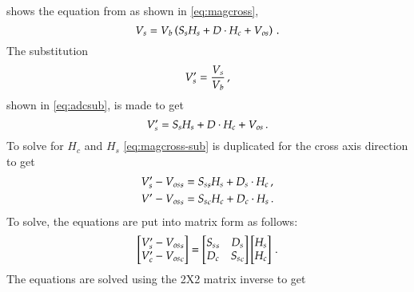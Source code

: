

\label{ch:mag-deriv}

 shows the equation from \cite{AN215} as shown in \cref{eq:magcross},
\begin{equation}
    V_s = V_b \left(S_s H_s + D \cdot H_c + V_{os} \right) \,.
    \label{eq:magcross2}
\end{equation}
The substitution
\begin{equation}
    V_s' =\frac{V_s}{V_b}\,,
\end{equation}
shown in \cref{eq:adcsub}, is made to get
\begin{equation}
    V_s' = S_s H_s + D \cdot H_c + V_{os}\,.
    \label{eq:magcross-sub}
\end{equation}
To solve for $H_c$ and $H_s$ \cref{eq:magcross-sub} is duplicated for the cross axis direction to get
\begin{equation}
    \begin{aligned}
        V_s' - {V_{os}}_s &=  {S_s}_s H_s  + D_s \cdot H_c\,,\\
        V' - {V_{os}}_s &=  {S_s}_c H_c  + D_c \cdot H_s\,.
    \end{aligned}
    \label{eq:add-cross}
\end{equation}
To solve, the equations are put into matrix form as follows:
\begin{equation}
    \begin{bmatrix}
        V'_s - {V_{os}}_s\\
        V'_c - {V_{os}}_c\\
    \end{bmatrix} =
    \begin{bmatrix}
        {S_s}_s & D_s \\
        D_c & {S_s}_c \\
    \end{bmatrix}
    \begin{bmatrix}
        H_s\\
        H_c\\
    \end{bmatrix} \,.
    \label{eq:eqmat}
\end{equation}
The equations are solved using the 2X2 matrix inverse to get

